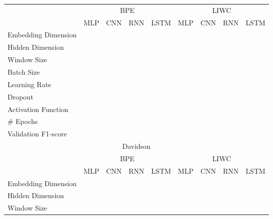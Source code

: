 \begin{landscape}
\begin{table}[]
\centering
\begin{tabular}{l|llll|llll}
                       & \multicolumn{4}{c}{BPE}                 & \multicolumn{4}{c}{LIWC} \\
                       & MLP     & CNN      & RNN     & LSTM    & MLP     & CNN     & RNN     & LSTM     \\ \hline
Embedding Dimension    &         &          &         &         &         &         &         &          \\
Hidden Dimension       &         &          &         &         &         &         &         &          \\
Window Size            &         &          &         &         &         &         &         &          \\
Batch Size             &         &          &         &         &         &         &         &          \\
Learning Rate          &         &          &         &         &         &         &         &          \\
Dropout                &         &          &         &         &         &         &         &          \\
Activation Function    &         &          &         &         &         &         &         &          \\
# Epochs               &         &          &         &         &         &         &         &          \\
Validation F1-score    &         &          &         &         &         &         &         &          \\
  \toprule\multicolumn{9}{c}{Davidson}\\\toprule
                      & \multicolumn{4}{c}{BPE}               & \multicolumn{4}{c|}{LIWC} \\
                      & MLP     & CNN     & RNN     & LSTM    & MLP     & CNN     & RNN     & LSTM    \\ \hline
Embedding Dimension   &         &         &         &         &         &         &         &         \\
Hidden Dimension      &         &         &         &         &         &         &         &         \\
Window Size           &         &         &         &         &         &         &         &         \\

\end{tabular}
\end{table}
\end{landscape}
